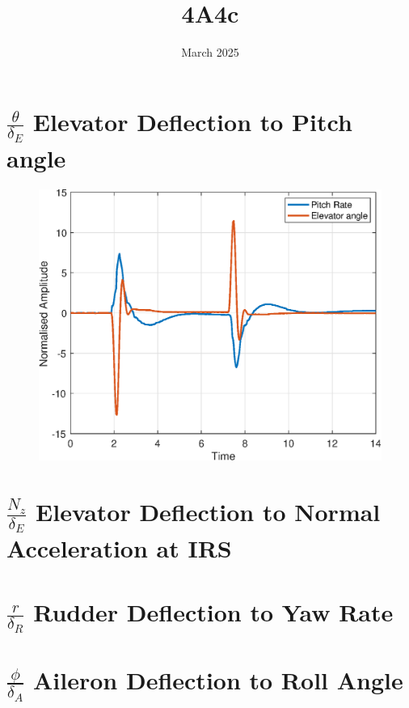 \documentclass[11pt]{article}
\title{4A4c}
\date{March 2025}
\begin{document}
\maketitle

\section{$\frac{\theta}{\delta_E}$ Elevator Deflection to Pitch angle}
    \begin{figure}
        \includegraphics{EtoQ_IO.eps}
        \label{}
        \caption{}
    \end{figure}


\section{$\frac{N_z}{\delta_E}$ Elevator Deflection to Normal Acceleration at IRS}

\section{$\frac{r}{\delta_R}$ Rudder Deflection to Yaw Rate}

\section{$\frac{\phi}{\delta_A}$ Aileron Deflection to Roll Angle}
\end{document}
